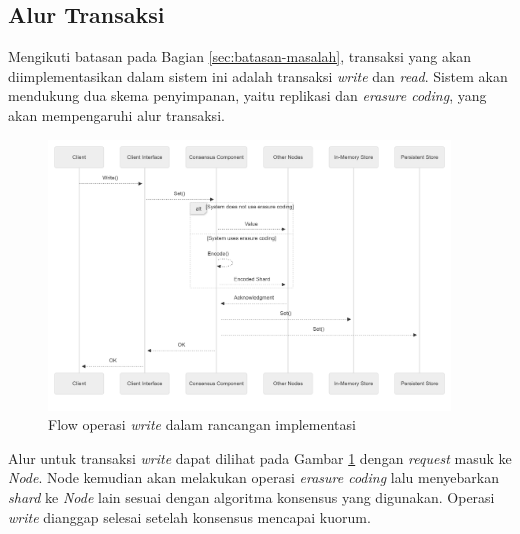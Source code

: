 \subsection{Alur Transaksi}
\label{subsection:system-flow}

Mengikuti batasan pada Bagian \ref{sec:batasan-masalah}, transaksi yang akan diimplementasikan dalam sistem ini adalah transaksi \textit{write} dan \textit{read}. Sistem akan mendukung dua skema penyimpanan, yaitu replikasi dan \textit{erasure coding}, yang akan mempengaruhi alur transaksi.

\begin{figure}[!ht]
	\centering
	\includegraphics[width=0.95\textwidth]{resources/chapter-3/flow-write.png}
	\caption{Flow operasi \textit{write} dalam rancangan implementasi}
	\label{fig:flow-write-mermaidjs}
\end{figure}

Alur untuk transaksi \textit{write} dapat dilihat pada Gambar \ref{fig:flow-write-mermaidjs} dengan \textit{request} masuk ke \textit{Node}. Node kemudian akan melakukan operasi \textit{erasure coding} lalu menyebarkan \textit{shard} ke \textit{Node} lain sesuai dengan algoritma konsensus yang digunakan. Operasi \textit{write} dianggap selesai setelah konsensus mencapai kuorum.

